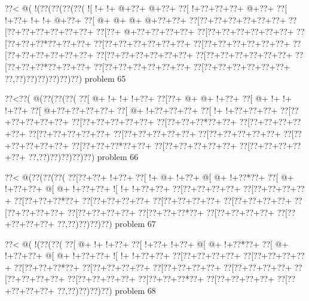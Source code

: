 \vbox{\vbox{\goo
\0??<\- @(\- !(\0??(\0??(\0??(\0??(
\- ![\- !+\- !+\- @+\0??+\- @+\0??+
\0??[\- !+\0??+\0??+\0??+\- @+\0??+
\0??[\- !+\0??+\- !+\- !+\- @+\0??+
\0??[\- @+\- @+\- @+\- @+\0??+\0??+
\0??[\0??+\0??+\0??+\0??+\0??+\0??+
\0??[\0??+\0??+\0??+\0??+\0??+\0??+
\0??[\0??+\- @+\0??+\0??+\0??+\0??+
\0??[\0??+\0??+\0??+\0??+\0??+\0??+
\0??[\0??+\0??+\0??*\0??+\0??+\0??+
\0??[\0??+\0??+\0??+\0??+\0??+\0??+
\0??[\0??+\0??+\0??+\0??+\0??+\0??+
\0??[\0??+\0??+\0??+\0??+\0??+\0??+
\0??[\0??+\0??+\0??+\0??+\0??+\0??+
\0??[\0??+\0??+\0??+\0??+\0??+\0??+
\0??[\0??+\0??+\0??*\0??+\0??+\0??+
\0??[\0??+\0??+\0??+\0??+\0??+\0??+
\0??[\0??+\0??+\0??+\0??+\0??+\0??+
\0??,\0??)\0??)\0??)\0??)\0??)\0??)
}
\hfil problem 65\hfil\break
}

\vbox{\vbox{\goo
\0??<\0??(\- @(\0??(\0??(\0??(
\0??[\- @+\- !+\- !+\- !+\0??+
\0??[\0??+\- @+\- @+\- !+\0??+
\0??[\- @+\- !+\- !+\- !+\0??+
\0??[\- @+\0??+\0??+\0??+\0??+
\0??[\- @+\- !+\0??+\0??+\0??+
\0??[\- !+\- !+\0??+\0??+\0??+
\0??[\0??+\0??+\0??+\0??+\0??+
\0??[\0??+\0??+\0??+\0??+\0??+
\0??[\0??+\0??+\0??*\0??+\0??+
\0??[\0??+\0??+\0??+\0??+\0??+
\0??[\0??+\0??+\0??+\0??+\0??+
\0??[\0??+\0??+\0??+\0??+\0??+
\0??[\0??+\0??+\0??+\0??+\0??+
\0??[\0??+\0??+\0??+\0??+\0??+
\0??[\0??+\0??+\0??*\0??+\0??+
\0??[\0??+\0??+\0??+\0??+\0??+
\0??[\0??+\0??+\0??+\0??+\0??+
\0??,\0??)\0??)\0??)\0??)\0??)
}
\hfil problem 66\hfil\break
}

\vbox{\vbox{\goo
\0??<\- @(\0??(\0??(\0??(
\0??[\0??+\0??+\- !+\0??+
\0??[\- !+\- @+\- !+\0??+
\- @[\- @+\- !+\0??*\0??+
\0??[\- @+\- !+\0??+\0??+
\- @[\- @+\- !+\0??+\0??+
\- ![\- !+\- !+\0??+\0??+
\0??[\0??+\0??+\0??+\0??+
\0??[\0??+\0??+\0??+\0??+
\0??[\0??+\0??+\0??*\0??+
\0??[\0??+\0??+\0??+\0??+
\0??[\0??+\0??+\0??+\0??+
\0??[\0??+\0??+\0??+\0??+
\0??[\0??+\0??+\0??+\0??+
\0??[\0??+\0??+\0??+\0??+
\0??[\0??+\0??+\0??*\0??+
\0??[\0??+\0??+\0??+\0??+
\0??[\0??+\0??+\0??+\0??+
\0??,\0??)\0??)\0??)\0??)
}
\hfil problem 67\hfil\break
}

\vbox{\vbox{\goo
\0??<\- @(\- !(\0??(\0??(
\0??[\- @+\- !+\- !+\0??+
\0??[\- !+\0??+\- !+\0??+
\- @[\- @+\- !+\0??*\0??+
\0??[\- @+\- !+\0??+\0??+
\- @[\- @+\- !+\0??+\0??+
\- ![\- !+\- !+\0??+\0??+
\0??[\0??+\0??+\0??+\0??+
\0??[\0??+\0??+\0??+\0??+
\0??[\0??+\0??+\0??*\0??+
\0??[\0??+\0??+\0??+\0??+
\0??[\0??+\0??+\0??+\0??+
\0??[\0??+\0??+\0??+\0??+
\0??[\0??+\0??+\0??+\0??+
\0??[\0??+\0??+\0??+\0??+
\0??[\0??+\0??+\0??*\0??+
\0??[\0??+\0??+\0??+\0??+
\0??[\0??+\0??+\0??+\0??+
\0??,\0??)\0??)\0??)\0??)
}
\hfil problem 68\hfil\break
}

